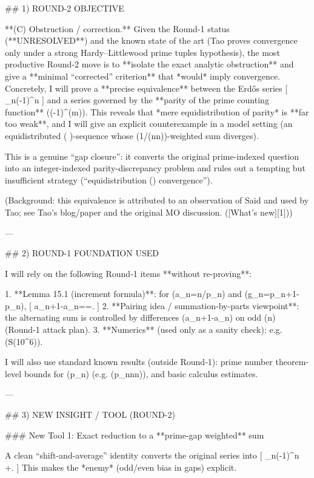 ## 1) ROUND-2 OBJECTIVE

**(C) Obstruction / correction.**
Given the Round‑1 status (**UNRESOLVED**) and the known state of the art (Tao proves convergence only under a strong Hardy–Littlewood prime tuples hypothesis), the most productive Round‑2 move is to **isolate the exact analytic obstruction** and give a **minimal “corrected” criterion** that *would* imply convergence. Concretely, I will prove a **precise equivalence** between the Erdős series
[
\sum_{n}(-1)^n
]
and a series governed by the **parity of the prime counting function** ((-1)^{\pi(m)}). This reveals that *mere equidistribution of parity* is **far too weak**, and I will give an explicit counterexample in a model setting (an equidistributed ({ })-sequence whose (1/(n\log n))-weighted sum diverges).

This is a genuine “gap closure”: it converts the original prime-indexed question into an integer-indexed parity-discrepancy problem and rules out a tempting but insufficient strategy (“equidistribution (\Rightarrow) convergence”).

(Background: this equivalence is attributed to an observation of Said and used by Tao; see Tao’s blog/paper and the original MO discussion. ([What's new][1]))

---

## 2) ROUND-1 FOUNDATION USED

I will rely on the following Round‑1 items **without re-proving**:

1. **Lemma 15.1 (increment formula)**: for (a_n=n/p_n) and (g_n=p_{n+1}-p_n),
   [
   a_{n+1}-a_n==.
   ]
2. **Pairing idea / summation-by-parts viewpoint**: the alternating sum is controlled by differences (a_{n+1}-a_n) on odd (n) (Round‑1 attack plan).
3. **Numerics** (used only as a sanity check): e.g. (S(10^6)).

I will also use standard known results (outside Round‑1): prime number theorem-level bounds for (p_n) (e.g. (p_n\asymp n\log n)), and basic calculus estimates.

---

## 3) NEW INSIGHT / TOOL (ROUND-2)

### New Tool 1: Exact reduction to a **prime-gap weighted** sum

A clean “shift-and-average” identity converts the original series into
[
\sum_{n}(-1)^n
\quad+\quad{}.
]
This makes the *enemy* (odd/even bias in gaps) explicit.

